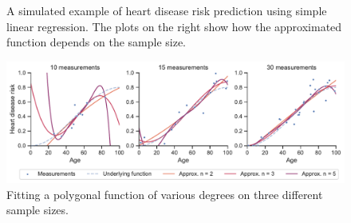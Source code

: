 \begin{figure}[t!]
 \hfill
 \hfill
 \hfill
 \caption{A simulated example of heart disease risk prediction using simple linear regression. The plots on the right show how the approximated function depends on the sample size.\label{fig:t1-t2-example}}
\end{figure}

\begin{figure}[t!]
 \centering
 \includegraphics[width=\columnwidth]{images/3/heart_disease_risk_samples_degrees}
 \caption{Fitting a polygonal function of various degrees on three different sample sizes.}
 \label{fig:reg-deg-2}
\end{figure}

